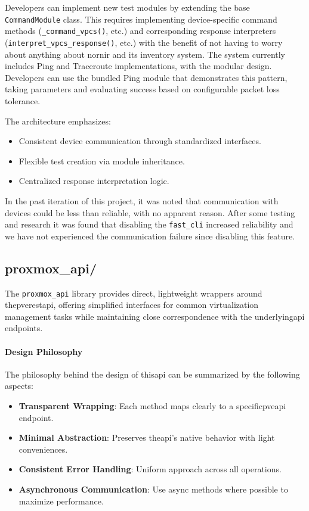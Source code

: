         Developers can implement new test modules by extending the base \texttt{CommandModule} class. This requires 
        implementing device-specific command methods (\texttt{\_command\_vpcs()}, etc.) 
        and corresponding response interpreters (\texttt{interpret\_vpcs\_response()}, etc.) with the benefit of not 
        having to worry about anything about nornir and its inventory system. The system currently includes Ping and 
        Traceroute implementations, with the modular design. Developers can use the bundled Ping module that 
        demonstrates this pattern, taking parameters and evaluating success based on configurable packet loss 
        tolerance.

        The architecture emphasizes:
        \begin{itemize}
            \item Consistent device communication through standardized interfaces.
            \item Flexible test creation via module inheritance.
            \item Centralized response interpretation logic.
        \end{itemize}

        In the past iteration of this project, it was noted that communication with devices could be less than reliable,
        with no apparent reason. After some testing and research it was found that disabling the \texttt{fast\_cli} 
        increased reliability and we have not experienced the communication failure since disabling this feature. 
    
    \subsection{proxmox\_api/}

        The \texttt{proxmox\_api} library provides direct, lightweight wrappers around the\ac{pve}\ac{rest}\ac{api}, 
        offering simplified interfaces for common virtualization management tasks while maintaining close 
        correspondence with the underlying\ac{api} endpoints.

        \paragraph{Design Philosophy}
        The philosophy behind the design of this\ac{api} can be summarized by the following aspects:
        \begin{itemize}
            \item \textbf{Transparent Wrapping}: Each method maps clearly to a specific\ac{pve}\ac{api} endpoint.
            \item \textbf{Minimal Abstraction}: Preserves the\ac{api}'s native behavior with light conveniences.
            \item \textbf{Consistent Error Handling}: Uniform approach across all operations.
            \item \textbf{Asynchronous Communication}: Use async methods where possible to maximize performance.
        \end{itemize}

